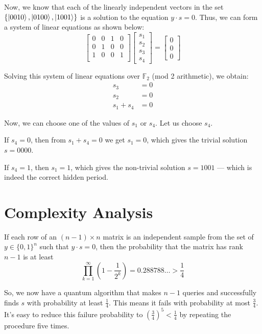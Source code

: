 \begin{example}
    Now, we know that each of the linearly independent vectors in the set $\{\ket{0010}, \ket{0100}, \ket{1001}\}$ is a solution to the equation $y \cdot s = 0$. Thus, we can form a system of linear equations as shown below:
\[
\begin{bmatrix}
    0 & 0 & 1 & 0 \\
    0 & 1 & 0 & 0 \\
    1 & 0 & 0 & 1 \\
\end{bmatrix}
\begin{bmatrix}
    s_1 \\
    s_2 \\
    s_3 \\
    s_4 
\end{bmatrix}
=
\begin{bmatrix}
    0 \\
    0 \\
    0 
\end{bmatrix}
\]

Solving this system of linear equations over $\mathbb{F}_2$ (mod 2 arithmetic), we obtain:
\begin{align*}
s_3 &= 0 \\
s_2 &= 0 \\
s_1 + s_4 &= 0
\end{align*}

Now, we can choose one of the values of $s_1$ or $s_4$. Let us choose $s_4$.

If $s_4 = 0$, then from $s_1 + s_4 = 0$ we get $s_1 = 0$, which gives the trivial solution $s = 0000$.

If $s_4 = 1$, then $s_1 = 1$, which gives the non-trivial solution $s = 1001$ — which is indeed the correct hidden period.
\end{example}

\section{Complexity Analysis}

If each row of an $(n-1) \times n$ matrix is an independent sample from the set of $y \in \{0,1\}^n$ such that $y \cdot s = 0$, then the probability that the matrix has rank $n-1$ is at least
\[
\prod_{k=1}^{\infty} \left(1 - \frac{1}{2^k} \right) = 0.288788\ldots > \frac{1}{4}
\]

So, we now have a quantum algorithm that makes $n-1$ queries and successfully finds $s$ with probability at least $\frac{1}{4}$. This means it fails with probability at most $\frac{3}{4}$. It's easy to reduce this failure probability to $\left(\frac{3}{4}\right)^5 < \frac{1}{4}$ by repeating the procedure five times.

